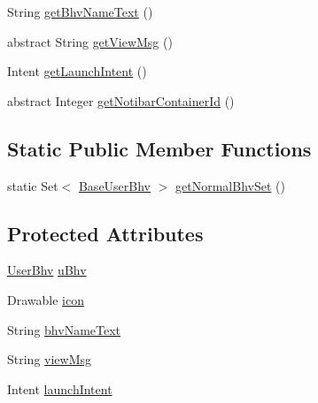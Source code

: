 \begin{DoxyCompactItemize}
\item 
\-String \hyperlink{classlab_1_1davidahn_1_1appshuttle_1_1view_1_1_viewable_user_bhv_abf4f398a343e6cb76c8ee33838b8f6a7}{get\-Bhv\-Name\-Text} ()
\item 
abstract \-String \hyperlink{classlab_1_1davidahn_1_1appshuttle_1_1view_1_1_viewable_user_bhv_adb1627e7a6c14729e24d56ce42957508}{get\-View\-Msg} ()
\item 
\-Intent \hyperlink{classlab_1_1davidahn_1_1appshuttle_1_1view_1_1_viewable_user_bhv_ad3970abd627658ac7cabbc82ce4ad9bb}{get\-Launch\-Intent} ()
\item 
abstract \-Integer \hyperlink{classlab_1_1davidahn_1_1appshuttle_1_1view_1_1_viewable_user_bhv_a699f19efcc68fbf7643bfe1823822c9d}{get\-Notibar\-Container\-Id} ()
\end{DoxyCompactItemize}
\subsection*{\-Static \-Public \-Member \-Functions}
\begin{DoxyCompactItemize}
\item 
static \-Set$<$ \hyperlink{classlab_1_1davidahn_1_1appshuttle_1_1collect_1_1bhv_1_1_base_user_bhv}{\-Base\-User\-Bhv} $>$ \hyperlink{classlab_1_1davidahn_1_1appshuttle_1_1view_1_1_viewable_user_bhv_af893511f940c257e524bf8d4377f20be}{get\-Normal\-Bhv\-Set} ()
\end{DoxyCompactItemize}
\subsection*{\-Protected \-Attributes}
\begin{DoxyCompactItemize}
\item 
\hyperlink{interfacelab_1_1davidahn_1_1appshuttle_1_1collect_1_1bhv_1_1_user_bhv}{\-User\-Bhv} \hyperlink{classlab_1_1davidahn_1_1appshuttle_1_1view_1_1_viewable_user_bhv_a562684126a3e756e8ebe246c89699ba9}{u\-Bhv}
\item 
\-Drawable \hyperlink{classlab_1_1davidahn_1_1appshuttle_1_1view_1_1_viewable_user_bhv_a19cdf3b4aa7489251bc2f88aa6f74383}{icon}
\item 
\-String \hyperlink{classlab_1_1davidahn_1_1appshuttle_1_1view_1_1_viewable_user_bhv_a547cc62d3a117e5fa530a9533de4d2d1}{bhv\-Name\-Text}
\item 
\-String \hyperlink{classlab_1_1davidahn_1_1appshuttle_1_1view_1_1_viewable_user_bhv_a3d0df3632dff466f64250df94c42e765}{view\-Msg}
\item 
\-Intent \hyperlink{classlab_1_1davidahn_1_1appshuttle_1_1view_1_1_viewable_user_bhv_a6116767fc74157a3b28598a8eda0c2e4}{launch\-Intent}
\end{DoxyCompactItemize}


